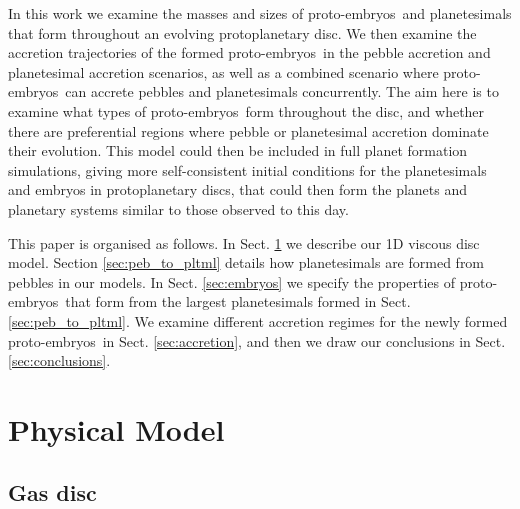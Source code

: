 \documentclass[a4paper,fleqn,usenatbib]{mnras}
\newcommand{\embs}{{{proto-embryos~}}}
\begin{document}
In this work we examine the masses and sizes of \embs and planetesimals that form throughout an evolving protoplanetary disc.
We then examine the accretion trajectories of the formed \embs in the pebble accretion and planetesimal accretion scenarios, as well as a combined scenario where \embs can accrete pebbles and planetesimals concurrently.
The aim here is to examine what types of \embs form throughout the disc, and whether there are preferential regions where pebble or planetesimal accretion dominate their evolution.
This model could then be included in full planet formation simulations, giving more self-consistent initial conditions for the planetesimals and embryos in protoplanetary discs, that could then form the planets and planetary systems similar to those observed to this day.

This paper is organised as follows. In Sect. \ref{sec:model} we describe our 1D viscous disc model. Section \ref{sec:peb_to_pltml} details how planetesimals are formed from pebbles in our models.
In Sect. \ref{sec:embryos} we specify the properties of \embs that form from the largest planetesimals formed in Sect. \ref{sec:peb_to_pltml}.
We examine different accretion regimes for the newly formed \embs in Sect. \ref{sec:accretion}, and then we draw our conclusions in Sect. \ref{sec:conclusions}.

\section{Physical Model}
\label{sec:model}
\subsection{Gas disc}
\end{document}
